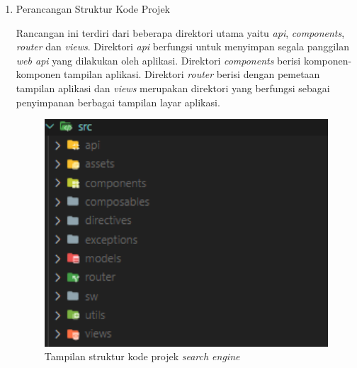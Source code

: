 \begin{enumerate}[label=\alph*)., leftmargin=1\parindent]
	\item{Perancangan Struktur Kode Projek}
	
	
	Rancangan ini terdiri dari beberapa direktori utama yaitu \textit{api}, \textit{components}, \textit{router} dan \textit{views}. Direktori \textit{api} berfungsi untuk menyimpan segala panggilan \textit{web api} yang dilakukan oleh aplikasi. Direktori \textit{components} berisi komponen-komponen tampilan aplikasi. Direktori \textit{router} berisi dengan pemetaan tampilan aplikasi dan \textit{views} merupakan direktori yang berfungsi sebagai penyimpanan berbagai tampilan layar aplikasi.
	
	\begin{figure}[H]
		\centering
		\includegraphics[keepaspectratio, width=16cm]{gambar/structure-project.png}
		\caption{Tampilan struktur kode projek \textit{search engine}}
		\label{gambar:structure-project.png}
	\end{figure}
%	

\end{enumerate}
